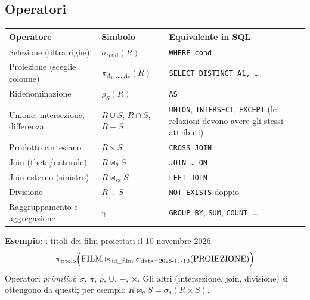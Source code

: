 \subsection{Operatori}
\begin{center}
\small
\begin{tabularx}{\textwidth}{@{}>{\raggedright\arraybackslash}p{3.7cm}>{\raggedright\arraybackslash}p{3.1cm}X@{}}
\toprule
\textbf{Operatore} & \textbf{Simbolo} & \textbf{Equivalente in SQL} \\
\midrule
Selezione (filtra righe) & $\sigma_{\text{cond}}(R)$ & \texttt{WHERE cond} \\
Proiezione (sceglie colonne) & $\pi_{A_1,\ldots,A_k}(R)$ & \texttt{SELECT DISTINCT A1, \ldots} \\
Ridenominazione & $\rho_{S}(R)$ & \texttt{AS} \\
Unione, intersezione, differenza & $R\cup S$, $R\cap S$, $R - S$ & \texttt{UNION}, \texttt{INTERSECT}, \texttt{EXCEPT} (le relazioni devono avere gli stessi attributi) \\
Prodotto cartesiano & $R\times S$ & \texttt{CROSS JOIN} \\
Join (theta/naturale) & $R \bowtie_{\theta} S$ & \texttt{JOIN \ldots{} ON} \\
Join esterno (sinistro) & $R \mathbin{\bowtie_{\text{sx}}} S$ & \texttt{LEFT JOIN} \\
Divisione & $R \div S$ & \texttt{NOT EXISTS} doppio \\
Raggruppamento e aggregazione & $\gamma$ & \texttt{GROUP BY}, \texttt{SUM}, \texttt{COUNT}, \ldots \\
\bottomrule
\end{tabularx}
\end{center}

\textbf{Esempio}: i titoli dei film proiettati il 10 novembre 2026.
\[
\pi_{\text{titolo}}\Bigl(\text{FILM} \bowtie_{\text{id\_film}} \sigma_{\text{data} = \text{2026-11-10}}(\text{PROIEZIONE})\Bigr)
\]
Operatori \emph{primitivi}: $\sigma$, $\pi$, $\rho$, $\cup$, $-$, $\times$. Gli altri (intersezione, join, divisione) si ottengono da questi; per esempio $R\bowtie_\theta S = \sigma_\theta(R\times S)$.


